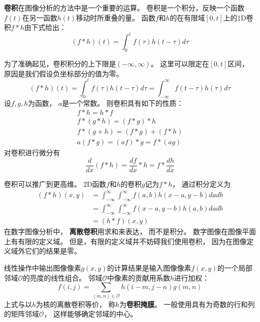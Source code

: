 \textbf{\color{magenta}卷积}在图像分析的方法中是一个重要的运算。%
卷积是一个积分，反映一个函数$f(t)$在另一函数$h(t)$移动时所重叠的量。%
函数$f$和$h$的在有限域$[0,t]$上的1D卷积$f*h$由下式给出：
\begin{equation}
  (f*h)(t) = \int_{0}^{t}f(\tau)h(t-\tau)d\tau
\end{equation}

为了准确起见，卷积积分的上下限是$(-\infty,\infty)$。%
这里可以限定在$[0,t]$区间，%
原因是我们假设负坐标部分的值为零。%
\begin{equation}
  (f*h)(t) = \int_{0}^{t}f(\tau)h(t-\tau)d\tau = \int_{-\infty}^{\infty}f(t-\tau)h(\tau)d\tau
\end{equation}
设$f,g,h$为函数，%
$a$是一个常数。%
则卷积具有如下的性质：
\begin{gather}
  f*h = h*f \\
  f*(g*h) = (f*g)*h\\
  f*(g+h) = (f*g) + (f*h)\\
  a(f*g) = (a f)*g = f*(a g)
\end{gather}
对卷积进行微分有
\begin{equation}
  \frac{d}{dx}(f*h) = \frac{df}{dx}*h = f*\frac{dh}{dx}
\end{equation}

卷积可以推广到更高维。%
2D函数$f$和$h$的卷积$g$记为$f*h$，%
通过积分定义为
\begin{equation}
  \begin{split}
    (f*h)(x,y) &= \int_{-\infty}^{\infty}\int_{-\infty}^{\infty}f(a,b)h(x-a,y-b)dadb\\
    &= \int_{-\infty}^{\infty}\int_{-\infty}^{\infty}f(x-a,y-b)h(a,b)dadb\\
    &= (h*f)(x,y)
  \end{split}
\end{equation}
在数字图像分析中，%
\textbf{\color{magenta}离散卷积}用求和来表达，%
而不是积分。%
数字图像在图像平面上有有限的定义域。%
但是，有限的定义域并不妨碍我们使用卷积，%
因为在图像定义域外它们的结果是零。%

线性操作中输出图像像素$g(x,y)$的计算结果是输入图像像素$f(x,y)$的一个局部邻域$\mathcal{O}$的亮度的线性组合。%
邻域$\mathcal{O}$中像素的贡献用系数$h$进行加权：
\begin{equation}
  f(i,j) = \sum_{(m,n)\in\mathcal{O}}h(i-m,j-n)g(m,n)
\end{equation}
上式与以$h$为核的离散卷积等价，%
称$h$为\textbf{\color{magenta}卷积掩膜}。%
一般使用具有为奇数的行和列的矩阵邻域$\mathcal{O}$，%
这样能够确定邻域的中心。


